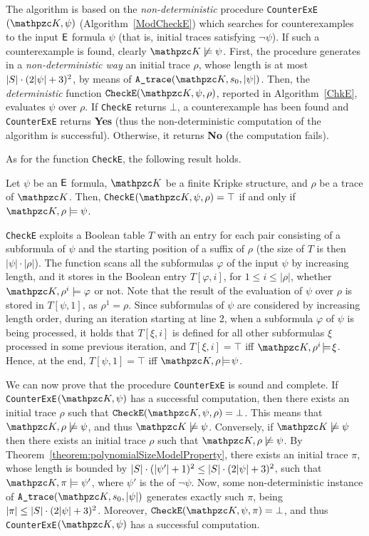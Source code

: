 The algorithm is based on the \emph{non-deterministic} procedure
\texttt{CounterExE}$(\Ku,\psi)$  (Algorithm~\ref{ModCheckE}) which searches for counterexamples to the input $\mathsf{E}$ formula $\psi$ (that is, initial traces satisfying $\neg\psi$). If such a counterexample is found, clearly $\Ku\not\models \psi$. First, the procedure generates in a \emph{non-deterministic way} an initial trace $\rho$, whose length is at most $|S|\cdot (2|\psi|+3)^2$, by means of $\texttt{A\_trace}(\Ku,\sinit,|\psi|)$. 
Then, the \emph{deterministic} function $\texttt{CheckE}(\Ku,\psi,\rho)$,  reported in Algorithm~\ref{ChkE}, evaluates $\psi$ over $\rho$. If \texttt{CheckE} returns $\bot$, a counterexample has been found and \texttt{CounterExE} returns \textbf{Yes} (thus the non-deterministic computation of the algorithm is successful). 
Otherwise, it returns \textbf{No} (the computation fails). 

As for the function \texttt{CheckE}, the following result holds. 
\begin{proposition} Let  $\psi$ be an $\mathsf{E}$ formula, $\Ku$ be a finite Kripke structure, and $\rho$ be a trace of $\Ku$. Then,
    \texttt{CheckE}$(\Ku,\psi,\rho)=\top $ if and only if $\Ku,\rho\models\psi$. 
\end{proposition}
\texttt{CheckE} exploits a Boolean
table $T$ with an entry for each pair consisting of a subformula of $\psi$ and the starting position of a suffix of $\rho$ (the size of $T$ is then $|\psi| \cdot |\rho|$). The function scans all the subformulas $\varphi$ of the input $\psi$ by increasing length, and it stores in the Boolean entry $T[\varphi,i]$, for $1\leq i\leq |\rho|$, whether $\Ku,\rho^i\models \varphi$ or not. 
Note that the result of the evaluation of $\psi$ over $\rho$ is stored in $T[\psi,1]$, as $\rho^1=\rho$.
Since subformulas of $\psi$ are considered by increasing length order, during an iteration starting at line 2,  when a subformula $\varphi$ of $\psi$ is being processed, it holds that $T[\xi,i]$ is defined for all other subformulas $\xi$ processed in some previous iteration, and $T[\xi,i]\!=\!\top$ iff $\Ku,\rho^i\!\models\! \xi$. Hence, at the end,
$T[\psi,1]\!=\!\top$ iff $\Ku,\rho \!\models\! \psi$.

We can now prove that the procedure \texttt{CounterExE} is sound and complete.
If \texttt{CounterExE}$(\Ku,\psi)$ has a successful computation, then there exists an initial trace $\rho$ such that $\texttt{CheckE}(\Ku,\psi,\rho)=\bot$. This means that $\Ku,\rho\not\models\psi$, and thus $\Ku\not\models\psi$.
%
Conversely, if $\Ku\not\models\psi$ then there exists an initial trace $\rho$ such that $\Ku,\rho\not\models \psi$.
By Theorem~\ref{theorem:polynomialSizeModelProperty}, there exists an initial trace $\pi$, whose length is bounded by $|S|\cdot (|\psi'|+1)^2\leq |S|\cdot (2|\psi|+3)^2$, such that $\Ku,\pi\models \psi'$, where $\psi'$ is the \nnf{} of $\neg\psi$.
Now, some non-deterministic instance of $\texttt{A\_trace}(\Ku,\sinit,|\psi|)$ generates exactly such $\pi$, being $|\pi|\leq |S|\cdot (2|\psi|+3)^2$. Moreover, $\texttt{CheckE}(\Ku,\psi,\pi)=\bot$, and thus
\texttt{CounterExE}$(\Ku,\psi)$ has a successful computation.

